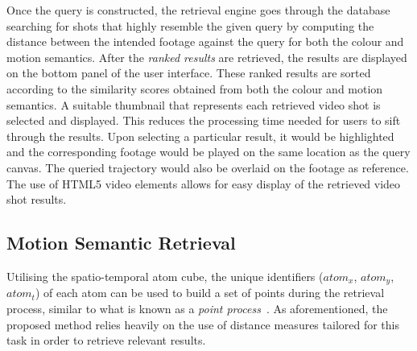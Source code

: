 Once the query is constructed, the retrieval engine goes through the database searching for shots that highly resemble the given query by computing the distance between the intended footage against the query for both the colour and motion semantics. 
After the \emph{ranked results} are retrieved, the results are displayed on the bottom panel of the user interface. 
These ranked results are sorted according to the similarity scores obtained from both the colour and motion semantics.
A suitable thumbnail that represents each retrieved video shot is selected and displayed. This reduces the processing time needed for users to sift through the results.
Upon selecting a particular result, it would be highlighted and the corresponding footage would be played on the same location as the query canvas. 
The queried trajectory would also be overlaid on the footage as reference.
The use of HTML5 video elements allows for easy display of the retrieved video shot results.


\subsection{Motion Semantic Retrieval}
\label{section:motionretrieval}

Utilising the spatio-temporal atom cube, the unique identifiers ($atom_x$, $atom_y$, $atom_t$) of each atom can be used to build a set of points during the retrieval process, similar to what is known as a \emph{point process}~\cite{diggle2013statistical}. As aforementioned, the proposed method relies heavily on the use of distance measures tailored for this task in order to retrieve relevant results.

